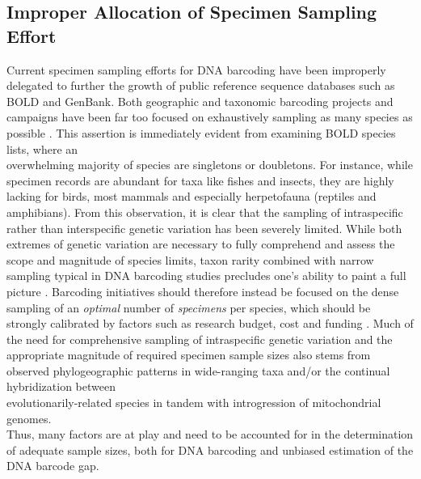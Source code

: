 \subsection{Improper Allocation of Specimen Sampling Effort}

Current specimen sampling efforts for DNA barcoding have been improperly \\ delegated to further the growth of public reference sequence databases such as BOLD and GenBank. Both geographic and taxonomic barcoding projects and campaigns have been far too focused on exhaustively sampling as many species as possible \cite{phillips2019incomplete, phillips2015exploration}. This assertion is immediately evident from examining BOLD species lists, where an \\ overwhelming majority of species are singletons or doubletons. For instance, while \\ specimen records are abundant for taxa like fishes and insects, they are highly lacking for birds, most mammals and especially herpetofauna (reptiles and amphibians). From this observation, it is clear that the sampling of intraspecific rather than interspecific genetic variation has been severely limited. While both extremes of genetic variation are necessary to fully comprehend and assess the scope and magnitude of species limits, taxon rarity combined with narrow sampling typical in DNA barcoding studies precludes one's ability to paint a full picture \cite{ahrens2016rarity}. Barcoding initiatives should therefore instead be focused on the dense sampling of an \textit{optimal} number of \textit{specimens} per species, which should be strongly calibrated by factors such as research budget, cost and funding \cite{cameron2006will, stein2014is}. Much of the need for comprehensive sampling of intraspecific genetic variation and the appropriate magnitude of required specimen sample sizes also stems from observed phylogeographic patterns in wide-ranging taxa 
and/or the continual hybridization between \\ evolutionarily-related species in tandem with introgression of mitochondrial genomes. \\ Thus, many factors are at play and need to be accounted for in the determination of adequate sample sizes, both for DNA barcoding and unbiased estimation of the DNA barcode gap.
 
 
 
